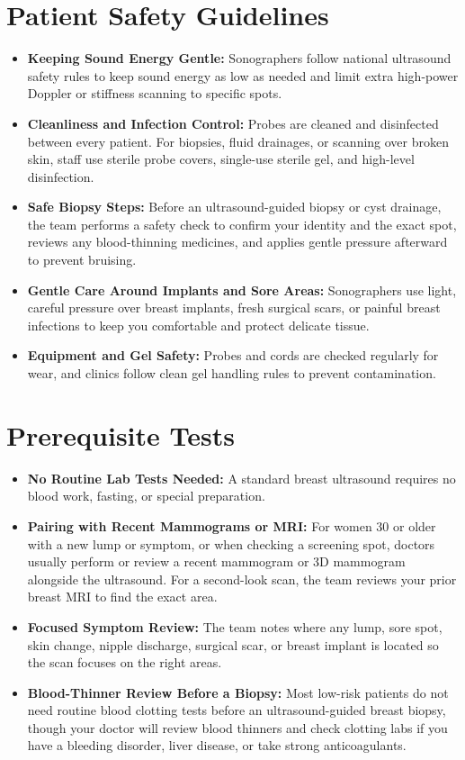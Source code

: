 \section{Patient Safety Guidelines}
\begin{itemize}
\item \textbf{Keeping Sound Energy Gentle:} Sonographers follow national ultrasound safety rules to keep sound energy as low as needed and limit extra high-power Doppler or stiffness scanning to specific spots.
\item \textbf{Cleanliness and Infection Control:} Probes are cleaned and disinfected between every patient. For biopsies, fluid drainages, or scanning over broken skin, staff use sterile probe covers, single-use sterile gel, and high-level disinfection.
\item \textbf{Safe Biopsy Steps:} Before an ultrasound-guided biopsy or cyst drainage, the team performs a safety check to confirm your identity and the exact spot, reviews any blood-thinning medicines, and applies gentle pressure afterward to prevent bruising.
\item \textbf{Gentle Care Around Implants and Sore Areas:} Sonographers use light, careful pressure over breast implants, fresh surgical scars, or painful breast infections to keep you comfortable and protect delicate tissue.
\item \textbf{Equipment and Gel Safety:} Probes and cords are checked regularly for wear, and clinics follow clean gel handling rules to prevent contamination.
\end{itemize}

\section{Prerequisite Tests}
\begin{itemize}
\item \textbf{No Routine Lab Tests Needed:} A standard breast ultrasound requires no blood work, fasting, or special preparation.
\item \textbf{Pairing with Recent Mammograms or MRI:} For women 30 or older with a new lump or symptom, or when checking a screening spot, doctors usually perform or review a recent mammogram or 3D mammogram alongside the ultrasound. For a second-look scan, the team reviews your prior breast MRI to find the exact area.
\item \textbf{Focused Symptom Review:} The team notes where any lump, sore spot, skin change, nipple discharge, surgical scar, or breast implant is located so the scan focuses on the right areas.
\item \textbf{Blood-Thinner Review Before a Biopsy:} Most low-risk patients do not need routine blood clotting tests before an ultrasound-guided breast biopsy, though your doctor will review blood thinners and check clotting labs if you have a bleeding disorder, liver disease, or take strong anticoagulants.
\end{itemize}

